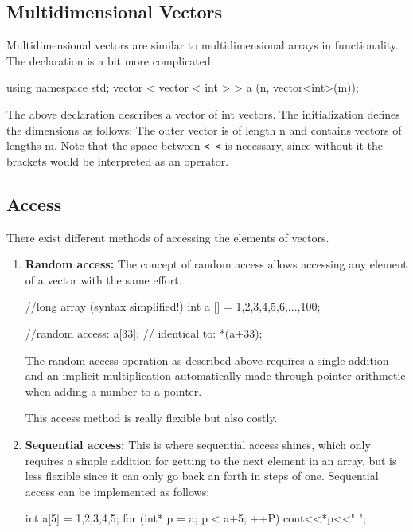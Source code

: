 \documentclass[10pt,a4paper]{scrartcl}
\begin{document}
\begin{multicols*}{2}
\subsection{Multidimensional Vectors}
\label{sec:MultidimensionalVectors}

Multidimensional vectors are similar to multidimensional arrays in functionality. The declaration is a bit more complicated:

\begin{TPCpp}
using namespace std;
vector < vector < int > > a (n, vector<int>(m));
\end{TPCpp}

The above declaration describes a vector of int vectors. The initialization defines the dimensions as follows: The outer vector is of length n and contains vectors of lengths m. Note that the space between \verb>< <> is necessary, since without it the brackets would be interpreted as an operator.

\subsection{Access}
\label{sec:Access}

There exist different methods of accessing the elements of vectors.

\begin{enumerate}
\item \textbf{Random access:} The concept of random access allows accessing any element of a vector with the same effort.

\begin{TPCpp}
//long array (syntax simplified!)
int a [] = {1,2,3,4,5,6,...,100};

//random access:
a[33]; // identical to: *(a+33);
\end{TPCpp}

The random access operation as described above requires a single addition and an implicit multiplication automatically made through pointer arithmetic when adding a number to a pointer.

This access method is really flexible but also costly.
\item \textbf{Sequential access:} This is where sequential access shines, which only requires a simple addition for getting to the next element in an array, but is less flexible since it can only go back an forth in steps of one. Sequential access can be implemented as follows:

\begin{TPCpp}
int a[5] = {1,2,3,4,5};
for (int* p = a; p < a+5; ++P)
	cout<<*p<<" ";
	

\end{TPCpp}
\end{enumerate}
\end{multicols*}
\end{document}

